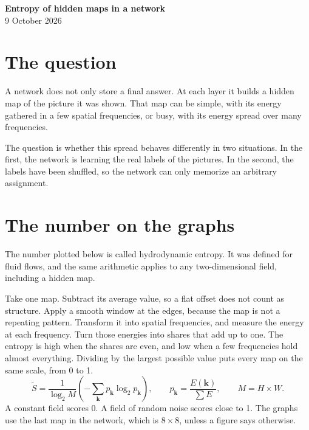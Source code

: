 \documentclass[11pt,a4paper]{article}
\begin{document}
\begin{center}
{\LARGE\bfseries Entropy of hidden maps in a network}\\[0.55em]
{\large 9 October 2026}
\end{center}
\vspace{0.4em}

\section{The question}

A network does not only store a final answer. At each layer it builds a hidden map of the picture it was shown. That map can be simple, with its energy gathered in a few spatial frequencies, or busy, with its energy spread over many frequencies.

The question is whether this spread behaves differently in two situations. In the first, the network is learning the real labels of the pictures. In the second, the labels have been shuffled, so the network can only memorize an arbitrary assignment.

\section{The number on the graphs}

The number plotted below is called hydrodynamic entropy. It was defined for fluid flows, and the same arithmetic applies to any two-dimensional field, including a hidden map.

Take one map. Subtract its average value, so a flat offset does not count as structure. Apply a smooth window at the edges, because the map is not a repeating pattern. Transform it into spatial frequencies, and measure the energy at each frequency. Turn those energies into shares that add up to one. The entropy is high when the shares are even, and low when a few frequencies hold almost everything. Dividing by the largest possible value puts every map on the same scale, from 0 to 1.
\begin{equation}
  \widetilde S
  = \frac{1}{\log_2 M}
    \left(-\sum_{\mathbf{k}} p_{\mathbf{k}}\log_2 p_{\mathbf{k}}\right),
  \qquad
  p_{\mathbf{k}} = \frac{E(\mathbf{k})}{\sum E},
  \qquad
  M = H \times W.
\end{equation}
A constant field scores 0. A field of random noise scores close to 1. The graphs use the last map in the network, which is \(8\times 8\), unless a figure says otherwise.
\end{document}
